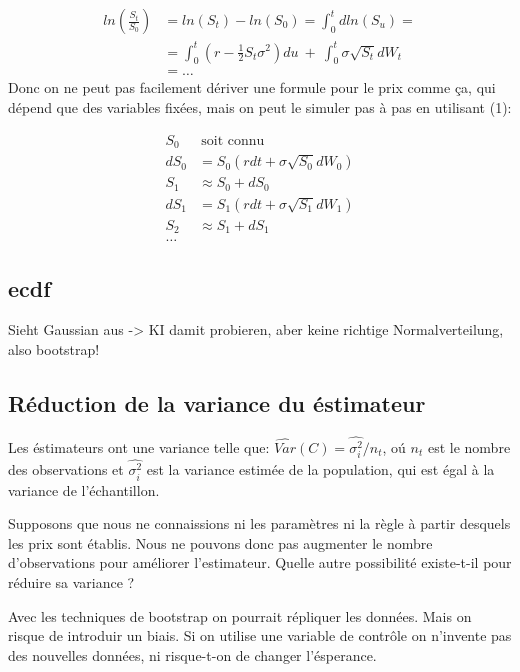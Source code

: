 \documentclass[a4paper,12pt]{scrartcl}
\begin{document}
\begin{align*}
ln( \frac{S_t}{S_0} ) 
&= ln(S_t)-ln(S_0) = \int_0^t dln(S_u) = \\
&= \int_0^t (r-\frac{1}{2} S_t \sigma^2)du~+~\int_0^t \sigma \sqrt{S_t}dW_t \\
&=\dots
\end{align*}
Donc on ne peut pas facilement dériver une formule pour le prix comme ça, qui dépend que des variables fixées, mais on peut le simuler pas à pas en utilisant (1):

\begin{equation} \label{6}
\begin{split}
S_0  &~\text{soit connu} \\
dS_0 &= S_0(rdt + \sigma \sqrt{S_0} dW_0) \\
S_1  &\approx S_0 + dS_0 \\
dS_1 &= S_1(rdt + \sigma \sqrt{S_1} dW_1) \\
S_2  &\approx S_1 + dS_1 \\
\dots
\end{split}
\end{equation}


\subsection{ecdf}
Sieht Gaussian aus -> KI damit probieren, aber keine richtige Normalverteilung, also bootstrap!

\subsection{Réduction de la variance du éstimateur}

Les éstimateurs ont une variance telle que:
$ \hat{Var}(C) = \hat{\sigma_i^2} / n_t$, oú $n_t$ est le nombre des observations et $\hat{\sigma_i^2}$ est la variance estimée de la population, qui est égal à la variance de l'échantillon.

Supposons que nous ne connaissions ni les paramètres ni la règle à partir desquels les prix sont établis. 
Nous ne pouvons donc pas augmenter le nombre d'observations pour améliorer l'estimateur.
Quelle autre possibilité existe-t-il pour réduire sa variance ?

Avec les techniques de bootstrap on pourrait répliquer les données. 
Mais on risque de introduir un biais.
Si on utilise une variable de contrôle on n'invente pas des nouvelles données, ni risque-t-on de changer l'ésperance.
\end{document}
